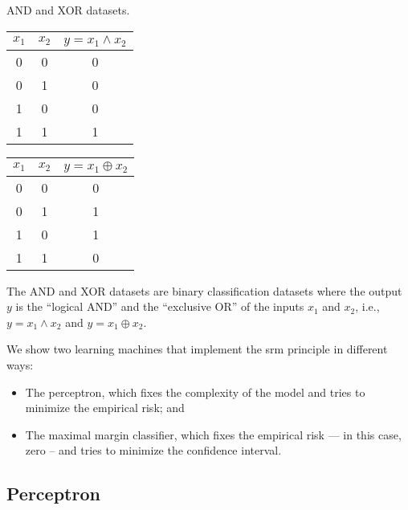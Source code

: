 \begin{tablebox}[label=tab:and-xor]{AND and XOR datasets.}
  \centering
  \begin{minipage}{0.45\textwidth}
    \centering
    \begin{tabular}{ccc}
      \toprule
      $x_1$ & $x_2$ & $y = x_1 \land x_2$ \\
      \midrule
      0 & 0 & 0 \\
      0 & 1 & 0 \\
      1 & 0 & 0 \\
      1 & 1 & 1 \\
      \bottomrule
    \end{tabular}
  \end{minipage}
  \begin{minipage}{0.45\textwidth}
  \centering
  \begin{tabular}{ccc}
    \toprule
    $x_1$ & $x_2$ & $y = x_1 \oplus x_2$ \\
    \midrule
    0 & 0 & 0 \\
    0 & 1 & 1 \\
    1 & 0 & 1 \\
    1 & 1 & 0 \\
    \bottomrule
  \end{tabular}
  \end{minipage}
  \tcblower
  The AND and XOR datasets are binary classification datasets where the output $y$ is the
  ``logical AND'' and the ``exclusive OR'' of the inputs $x_1$ and $x_2$, i.e.,
  $y = x_1 \land x_2$ and $y = x_1 \oplus x_2$.
\end{tablebox}

We show two learning machines that implement the \gls{srm} principle in different ways:
\begin{itemize}
  \itemsep0em
  \item The perceptron, which fixes the complexity of the model and tries to minimize the
    empirical risk; and
  \item The maximal margin classifier, which fixes the empirical risk --- in this case,
    zero -- and tries to minimize the confidence interval.
\end{itemize}

\subsection{Perceptron}
\label{sub:perceptron}

